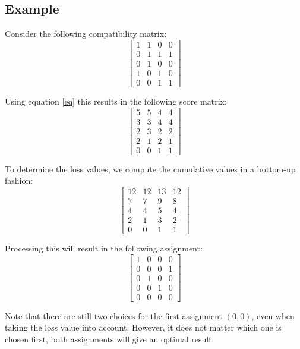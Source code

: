 \documentclass[paper=a4, fontsize=11pt]{scrartcl} %
\numberwithin{equation}{section} %
\numberwithin{figure}{section} %
\numberwithin{table}{section} %
\begin{document}
\subsection{Example}
Consider the following compatibility matrix:
\begin{equation}
	\begin{bmatrix}
	  1 & 1 & 0 & 0 \\
	  0 & 1 & 1 & 1 \\
	  0 & 1 & 0 & 0 \\
	  1 & 0 & 1 & 0 \\
	  0 & 0 & 1 & 1 
	\end{bmatrix}
\end{equation}

Using equation \ref{eq} this results in the following score matrix:
\begin{equation}
	\begin{bmatrix}
	  5 & 5 & 4 & 4 \\
	  3 & 3 & 4 & 4 \\
	  2 & 3 & 2 & 2 \\
	  2 & 1 & 2 & 1 \\
	  0 & 0 & 1 & 1 
	\end{bmatrix}
\end{equation}

To determine the loss values, we compute the cumulative values in a bottom-up fashion:
\begin{equation}
	\begin{bmatrix}
	  12 & 12 & 13 & 12 \\
	  7 & 7 & 9 & 8 \\
	  4 & 4 & 5 & 4 \\
	  2 & 1 & 3 & 2 \\
	  0 & 0 & 1 & 1 
	\end{bmatrix}
\end{equation}

Processing this will result in the following assignment:
\begin{equation} 
	\begin{bmatrix}
	  1 &0&0&0 \\
	  0&0&0& 1 \\
	  0& 1&0&0 \\
	  0&0& 1 &0 \\
	  0&0&0& 0
	\end{bmatrix}
\end{equation}

Note that there are still two choices for the first assignment $(0,0)$, even when taking the loss value into account.
However, it does not matter which one is chosen first, both assignments will give an optimal result.
\end{document}
